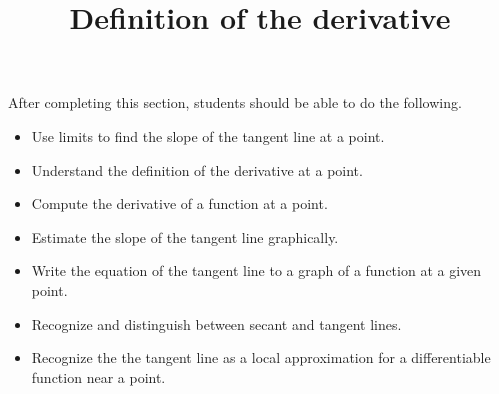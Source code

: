 \documentclass{ximera}
\title{Definition of the derivative}
\begin{document}
\begin{abstract}
\end{abstract}

\maketitle

\begin{sectionOutcomes}

After completing this section, students should be able to do the following.

\begin{itemize}
\item Use limits to find the slope of the tangent line at a point.
\item Understand the definition of the derivative at a point.
\item Compute the derivative of a function at a point.
\item Estimate the slope of the tangent line graphically.
\item Write the equation of the tangent line to a graph of a function at a given point.
\item Recognize and distinguish between secant and tangent lines.
\item Recognize the the tangent line as a local approximation for a
  differentiable function near a point.
\end{itemize}

\end{sectionOutcomes}
\end{document}
